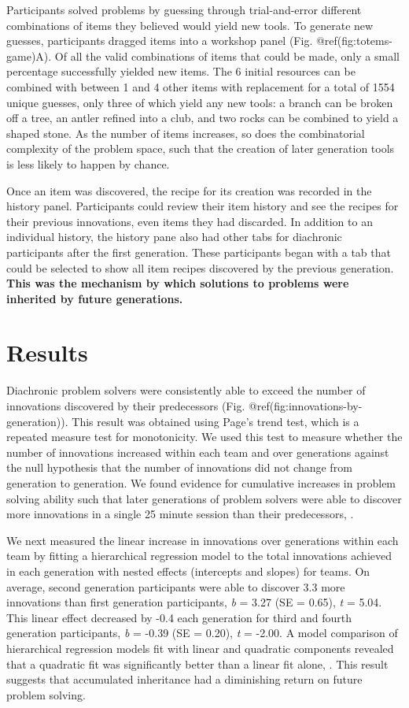 \documentclass[10pt, letterpaper]{article}
\begin{document}
Participants solved problems by guessing through trial-and-error
different combinations of items they believed would yield new tools. To
generate new guesses, participants dragged items into a workshop panel
(Fig. @ref(fig:totems-game)A). Of all the valid combinations of items
that could be made, only a small percentage successfully yielded new
items. The 6 initial resources can be combined with between 1 and 4
other items with replacement for a total of 1554 unique guesses, only
three of which yield any new tools: a branch can be broken off a tree,
an antler refined into a club, and two rocks can be combined to yield a
shaped stone. As the number of items increases, so does the
combinatorial complexity of the problem space, such that the creation of
later generation tools is less likely to happen by chance.

Once an item was discovered, the recipe for its creation was recorded in
the history panel. Participants could review their item history and see
the recipes for their previous innovations, even items they had
discarded. In addition to an individual history, the history pane also
had other tabs for diachronic participants after the first generation.
These participants began with a tab that could be selected to show all
item recipes discovered by the previous generation. \textbf{This was the
mechanism by which solutions to problems were inherited by future
generations.}

\hypertarget{results}{%
\section{Results}\label{results}}

Diachronic problem solvers were consistently able to exceed the number
of innovations discovered by their predecessors (Fig.
@ref(fig:innovations-by-generation)). This result was obtained using
Page's trend test, which is a repeated measure test for monotonicity. We
used this test to measure whether the number of innovations increased
within each team and over generations against the null hypothesis that
the number of innovations did not change from generation to generation.
We found evidence for cumulative increases in problem solving ability
such that later generations of problem solvers were able to discover
more innovations in a single 25 minute session than their predecessors,
.

We next measured the linear increase in innovations over generations
within each team by fitting a hierarchical regression model to the total
innovations achieved in each generation with nested effects (intercepts
and slopes) for teams. On average, second generation participants were
able to discover 3.3 more innovations than first generation
participants, \emph{b} = 3.27 (SE = 0.65), \emph{t} = 5.04. This linear
effect decreased by -0.4 each generation for third and fourth generation
participants, \emph{b} = -0.39 (SE = 0.20), \emph{t} = -2.00. A model
comparison of hierarchical regression models fit with linear and
quadratic components revealed that a quadratic fit was significantly
better than a linear fit alone, . This result suggests that accumulated
inheritance had a diminishing return on future problem solving.
\end{document}
